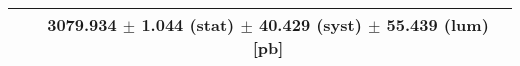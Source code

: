\begin{tabular}{lc}
\hline
                               & 3079.934 $\pm$ 1.044 (stat) $\pm$ 40.429 (syst) $\pm$ 55.439 (lum) [pb]  \\
\hline
\end{tabular}
